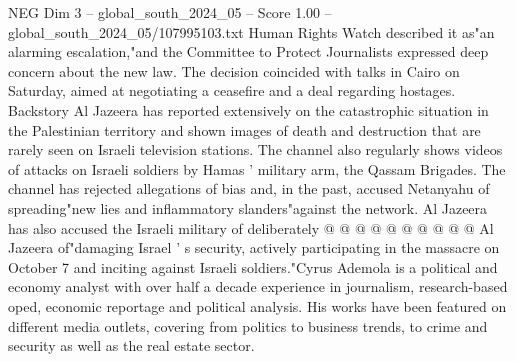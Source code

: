 \begin{textsample}{NEG Dim 3 – global\_south\_2024\_05 – Score 1.00 – global\_south\_2024\_05/107995103.txt}
Human Rights Watch described it as"an alarming escalation,"and the Committee to Protect Journalists expressed deep concern about the new law.
The decision coincided with talks in Cairo on Saturday, aimed at negotiating a ceasefire and a deal regarding hostages.
Backstory Al Jazeera has reported extensively on the catastrophic situation in the Palestinian territory and shown images of death and destruction that are rarely seen on Israeli television stations.
The channel also regularly shows videos of attacks on Israeli soldiers by Hamas ' military arm, the Qassam Brigades.
The channel has rejected allegations of bias and, in the past, accused Netanyahu of spreading"new lies and inflammatory slanders"against the network.
Al Jazeera has also accused the Israeli military of deliberately @ @ @ @ @ @ @ @ @ @ Al Jazeera of"damaging Israel ' s security, actively participating in the massacre on October 7 and inciting against Israeli soldiers."Cyrus Ademola is a political and economy analyst with over half a decade experience in journalism, research-based oped, economic reportage and political analysis.
His works have been featured on different media outlets, covering from politics to business trends, to crime and security as well as the real estate sector.

\end{textsample}
